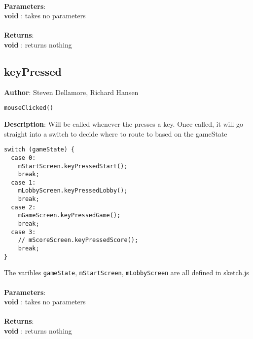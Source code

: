 \documentclass[12pt]{article}
\begin{document}
\textbf{\large{\\Parameters}}:\\
\textbf{void }: takes no parameters\\\textbf{\large{\\Returns}}:\\\textbf{void }: returns nothing

\subsection{keyPressed}
\textbf{Author}: Steven Dellamore, Richard Hansen 
\vspace*{1\baselineskip}
\begin{lstlisting}
mouseClicked()
\end{lstlisting} 
\vspace*{1\baselineskip}
\textbf{Description}: Will be called whenever the presses a key. Once called, it will go straight into a switch to decide where to route to based on the gameState 
\begin{verbatim}
switch (gameState) {
  case 0:
    mStartScreen.keyPressedStart();
    break;
  case 1:
    mLobbyScreen.keyPressedLobby();
    break;
  case 2:
    mGameScreen.keyPressedGame();
    break;
  case 3:
    // mScoreScreen.keyPressedScore();
    break;
}
\end{verbatim}
 The varibles \texttt{gameState}, \texttt{mStartScreen}, \texttt{mLobbyScreen} are all defined in sketch.js \\


\textbf{\large{\\Parameters}}:\\
\textbf{void }: takes no parameters\\\textbf{\large{\\Returns}}:\\\textbf{void }: returns nothing
\end{document}
